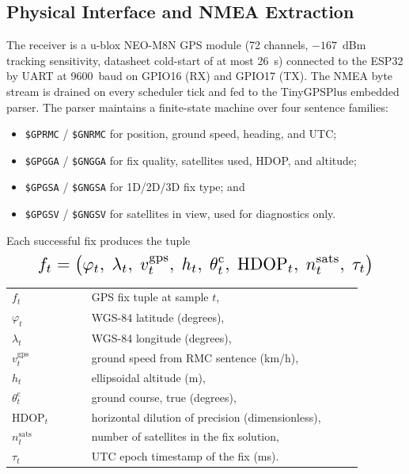 \subsection{Physical Interface and NMEA Extraction}
The receiver is a u-blox NEO-M8N GPS module (72 channels, $-167$~dBm tracking sensitivity, datasheet cold-start of at most 26~s) connected to the ESP32 by UART at 9600~baud on GPIO16 (RX) and GPIO17 (TX). The NMEA byte stream is drained on every scheduler tick and fed to the TinyGPSPlus embedded parser. The parser maintains a finite-state machine over four sentence families:
\begin{itemize}
    \item \texttt{\$GPRMC} / \texttt{\$GNRMC} for position, ground speed, heading, and UTC;
    \item \texttt{\$GPGGA} / \texttt{\$GNGGA} for fix quality, satellites used, HDOP, and altitude;
    \item \texttt{\$GPGSA} / \texttt{\$GNGSA} for 1D/2D/3D fix type; and
    \item \texttt{\$GPGSV} / \texttt{\$GNGSV} for satellites in view, used for diagnostics only.
\end{itemize}
Each successful fix produces the tuple
\begin{equation}
\resizebox{0.88\linewidth}{!}{$\displaystyle
f_t = \bigl(\varphi_t,\; \lambda_t,\; v^{\mathrm{gps}}_t,\; h_t,\; \theta^{\mathrm{c}}_t,\; \mathrm{HDOP}_t,\; n^{\mathrm{sats}}_t,\; \tau_t \bigr)
$}
\label{eq:gps_tuple}
\end{equation}
\noindent\begin{tabular}{@{}p{0.20\linewidth}@{\quad}p{0.68\linewidth}@{}}
$f_t$ & GPS fix tuple at sample $t$, \\
$\varphi_t$ & WGS-84 latitude (degrees), \\
$\lambda_t$ & WGS-84 longitude (degrees), \\
$v^{\mathrm{gps}}_t$ & ground speed from RMC sentence (km/h), \\
$h_t$ & ellipsoidal altitude (m), \\
$\theta^{\mathrm{c}}_t$ & ground course, true (degrees), \\
$\mathrm{HDOP}_t$ & horizontal dilution of precision (dimensionless), \\
$n^{\mathrm{sats}}_t$ & number of satellites in the fix solution, \\
$\tau_t$ & UTC epoch timestamp of the fix (ms).
\end{tabular}

